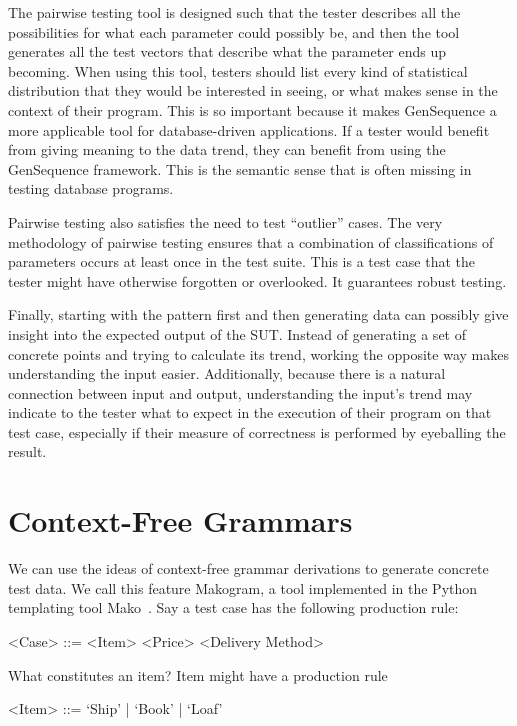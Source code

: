 The pairwise testing tool is designed such that the tester describes all the possibilities for what each parameter could possibly be, and then the tool generates all the test vectors that describe what the parameter ends up becoming. When using this tool, testers should list every kind of statistical distribution that they would be interested in seeing, or what makes sense in the context of their program. This is so important because it makes GenSequence a more applicable tool for database-driven applications. If a tester would benefit from giving meaning to the data trend, they can benefit from using the GenSequence framework. This is the semantic sense that is often missing in testing database programs.

Pairwise testing also satisfies the need to test ``outlier'' cases. The very methodology of pairwise testing ensures that a combination of classifications of parameters occurs at least once in the test suite. This is a test case that the tester might have otherwise forgotten or overlooked. It guarantees robust testing.

Finally, starting with the pattern first and then generating data can possibly give insight into the expected output of the SUT. Instead of generating a set of concrete points and trying to calculate its trend, working the opposite way makes understanding the input easier. Additionally, because there is a natural connection between input and output, understanding the input's trend may indicate to the tester what to expect in the execution of their program on that test case, especially if their measure of correctness is performed by eyeballing the result.

\section{Context-Free Grammars}
We can use the ideas of context-free grammar derivations to generate concrete test data. We call this feature Makogram, a tool implemented in the Python templating tool Mako~\cite{Mako:Template}. Say a test case has the following production rule:

\begin{grammar}
<Case> ::= <Item> <Price> <Delivery Method>
\end{grammar}

What constitutes an item? Item might have a production rule 
\begin{grammar}
<Item> ::= `Ship' | `Book' | `Loaf'
\end{grammar}


